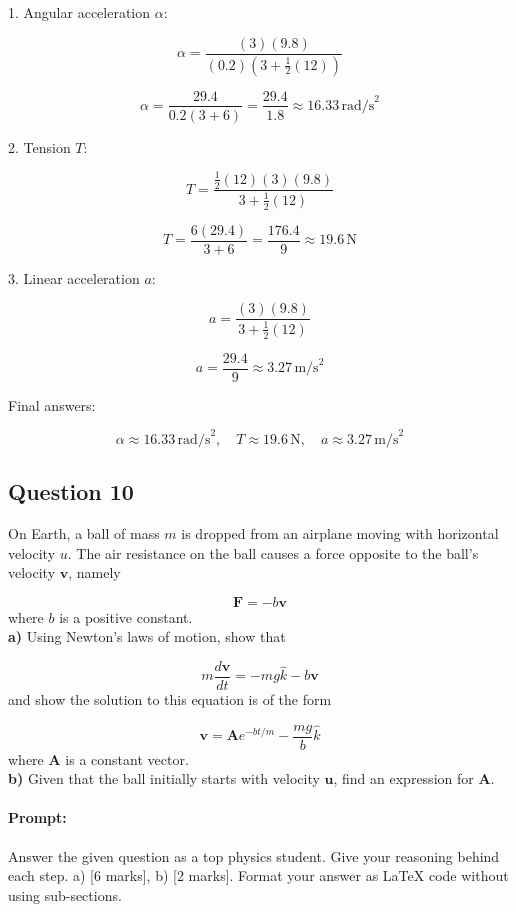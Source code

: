 \documentclass{article}
\begin{document}
1. Angular acceleration $\alpha$:

\[
\alpha = \frac{(3)(9.8)}{(0.2)\left(3 + \frac{1}{2}(12)\right)}
\]

\[
\alpha = \frac{29.4}{0.2(3 + 6)} = \frac{29.4}{1.8} \approx 16.33\,\text{rad/s}^2
\]

2. Tension $T$:

\[
T = \frac{\frac{1}{2}(12)(3)(9.8)}{3 + \frac{1}{2}(12)}
\]

\[
T = \frac{6(29.4)}{3 + 6} = \frac{176.4}{9} \approx 19.6\,\text{N}
\]

3. Linear acceleration $a$:

\[
a = \frac{(3)(9.8)}{3 + \frac{1}{2}(12)}
\]

\[
a = \frac{29.4}{9} \approx 3.27\,\text{m/s}^2
\]

Final answers:

\[
\boxed{\alpha \approx 16.33\,\text{rad/s}^2, \quad T \approx 19.6\,\text{N}, \quad a \approx 3.27\,\text{m/s}^2}
\]

\subsection{Question 10}

On Earth, a ball of mass $m$ is dropped from an airplane moving with horizontal velocity $u$. The air resistance on the ball causes a force opposite to the ball's velocity $\mathbf{v}$, namely

\[
\mathbf{F} = -b \mathbf{v}
\]
where $b$ is a positive constant. \\

\textbf{a)} Using Newton's laws of motion, show that

\[
m \frac{d \mathbf{v}}{dt} = -mg \hat{k} - b \mathbf{v}
\]
and show the solution to this equation is of the form

\[
\mathbf{v} = \mathbf{A} e^{-bt/m} - \frac{mg}{b} \hat{k}
\]
where $\mathbf{A}$ is a constant vector.\\

\textbf{b)} Given that the ball initially starts with velocity $\mathbf{u}$, find an expression for $\mathbf{A}$.

\paragraph{Prompt: \\} 
Answer the given question as a top physics student. Give your reasoning behind each step. a) [6 marks], b) [2 marks].
Format your answer as LaTeX code without using sub-sections.
\end{document}
